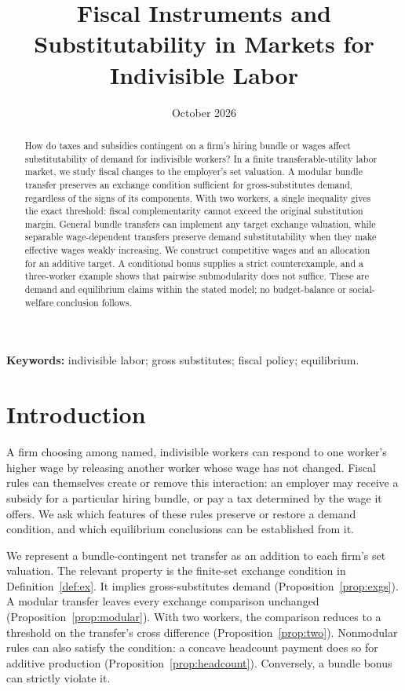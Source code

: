 \documentclass[11pt]{article}
\title{Fiscal Instruments and Substitutability in Markets for Indivisible Labor}
\author{}
\date{October 2026}
\theoremstyle{definition}
\theoremstyle{remark}
\numberwithin{equation}{section}
\begin{document}
\maketitle

\begin{abstract}
How do taxes and subsidies contingent on a firm's hiring bundle or wages affect substitutability of demand for indivisible workers? In a finite transferable-utility labor market, we study fiscal changes to the employer's set valuation. A modular bundle transfer preserves an exchange condition sufficient for gross-substitutes demand, regardless of the signs of its components. With two workers, a single inequality gives the exact threshold: fiscal complementarity cannot exceed the original substitution margin. General bundle transfers can implement any target exchange valuation, while separable wage-dependent transfers preserve demand substitutability when they make effective wages weakly increasing. We construct competitive wages and an allocation for an additive target. A conditional bonus supplies a strict counterexample, and a three-worker example shows that pairwise submodularity does not suffice. These are demand and equilibrium claims within the stated model; no budget-balance or social-welfare conclusion follows.
\end{abstract}

\noindent\textbf{Keywords:} indivisible labor; gross substitutes; fiscal policy; equilibrium.

\section{Introduction}
A firm choosing among named, indivisible workers can respond to one worker's higher wage by releasing another worker whose wage has not changed. Fiscal rules can themselves create or remove this interaction: an employer may receive a subsidy for a particular hiring bundle, or pay a tax determined by the wage it offers. We ask which features of these rules preserve or restore a demand condition, and which equilibrium conclusions can be established from it.

We represent a bundle-contingent net transfer as an addition to each firm's set valuation. The relevant property is the finite-set exchange condition in Definition~\ref{def:ex}. It implies gross-substitutes demand (Proposition~\ref{prop:exgs}). A modular transfer leaves every exchange comparison unchanged (Proposition~\ref{prop:modular}). With two workers, the comparison reduces to a threshold on the transfer's cross difference (Proposition~\ref{prop:two}). Nonmodular rules can also satisfy the condition: a concave headcount payment does so for additive production (Proposition~\ref{prop:headcount}). Conversely, a bundle bonus can strictly violate it.
\end{document}
